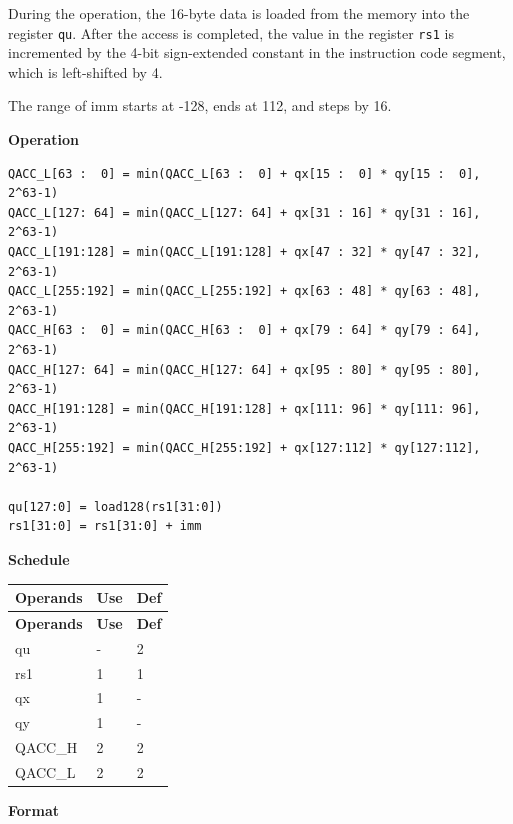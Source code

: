 During the operation, the 16-byte data is loaded from the memory into the register \lstinline{qu}. After the access is completed, the value in the register \lstinline{rs1} is incremented by the 4-bit sign-extended constant in the instruction code segment, which is left-shifted by 4.

The range of imm starts at -128, ends at 112, and steps by 16.

\textbf{Operation}\\
\begin{lstlisting}
QACC_L[63 :  0] = min(QACC_L[63 :  0] + qx[15 :  0] * qy[15 :  0], 2^63-1)
QACC_L[127: 64] = min(QACC_L[127: 64] + qx[31 : 16] * qy[31 : 16], 2^63-1)
QACC_L[191:128] = min(QACC_L[191:128] + qx[47 : 32] * qy[47 : 32], 2^63-1)
QACC_L[255:192] = min(QACC_L[255:192] + qx[63 : 48] * qy[63 : 48], 2^63-1)
QACC_H[63 :  0] = min(QACC_H[63 :  0] + qx[79 : 64] * qy[79 : 64], 2^63-1)
QACC_H[127: 64] = min(QACC_H[127: 64] + qx[95 : 80] * qy[95 : 80], 2^63-1)
QACC_H[191:128] = min(QACC_H[191:128] + qx[111: 96] * qy[111: 96], 2^63-1)
QACC_H[255:192] = min(QACC_H[255:192] + qx[127:112] * qy[127:112], 2^63-1)

qu[127:0] = load128(rs1[31:0])
rs1[31:0] = rs1[31:0] + imm
\end{lstlisting}

\textbf{Schedule}\\
\begin{longtable}[c]{|l|l|l|}
    \hline
    \rowcolor{lightgray}
    \textbf{Operands} & \textbf{Use} & \textbf{Def} \\\hline
    \endfirsthead
    \hline
    \rowcolor{lightgray}
     \textbf{Operands} & \textbf{Use} & \textbf{Def} \\\hline
    \endhead
    \hline
    \endfoot

    qu & - & 2 \\\hline
    rs1 & 1 & 1 \\\hline
     qx & 1 & - \\\hline
     qy & 1 & - \\\hline
     QACC\_H & 2 & 2 \\\hline
     QACC\_L & 2 & 2

\end{longtable}

\textbf{Format}\\

